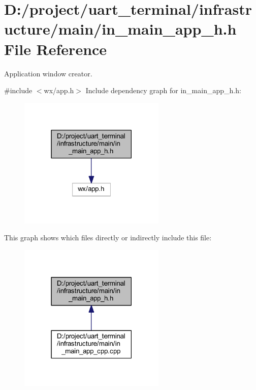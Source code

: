 \section{D\+:/project/uart\+\_\+terminal/infrastructure/main/in\+\_\+main\+\_\+app\+\_\+h.h File Reference}
\label{in__main__app__h_8h}


Application window creator.  


{\ttfamily \#include $<$wx/app.\+h$>$}\newline
Include dependency graph for in\+\_\+main\+\_\+app\+\_\+h.\+h\+:\nopagebreak
\begin{figure}[H]
\begin{center}
\leavevmode
\includegraphics[width=198pt]{in__main__app__h_8h__incl}
\end{center}
\end{figure}
This graph shows which files directly or indirectly include this file\+:\nopagebreak
\begin{figure}[H]
\begin{center}
\leavevmode
\includegraphics[width=198pt]{in__main__app__h_8h__dep__incl}
\end{center}
\end{figure}
